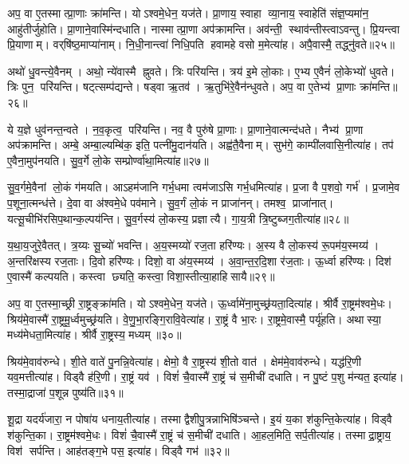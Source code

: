 अप॒ वा ए॒तस्मात्प्रा॒णाः क्रा॑मन्ति।
योऽश्वमे॒धेन॒ यज॑ते।
प्रा॒णाय॒ स्वाहा व्या॒नाय॒ स्वाहेति॑ संज्ञ॒प्यमा॑न॒ आहु॑तीर्जुहोति।
प्रा॒णाने॒वास्मि॑न्दधाति।
नास्मात्प्रा॒णा अप॑क्रामन्ति।
अव॑न्ती॒ स्थाव॑न्तीस्त्वाऽवन्तु।
प्रि॒यन्त्वा प्रि॒याणाम्।
वर्‌षि॑ष्ठ॒माप्या॑नाम्।
नि॒धी॒नान्त्वा॑ निधि॒पति हवामहे वसो म॒मेत्या॑ह।
अपै॒वास्मै॒ तद्ध्नु॑वते॥२५॥

अथो॑ धु॒वन्त्ये॒वैनम्।
अथो॒ न्ये॑वास्मै ह्नुवते।
त्रिः परि॑यन्ति।
त्रय॑ इ॒मे लो॒काः।
ए॒भ्य ए॒वैनं॑ लो॒केभ्यो॑ धुवते।
त्रिः पुन॒ परि॑यन्ति।
षट्त्सम्प॑द्यन्ते।
षड्वा ऋ॒तव॑।
ऋ॒तुभि॑रे॒वैन॑न्धुवते।
अप॒ वा ए॒तेभ्य॑ प्रा॒णाः क्रा॑मन्ति॥२६॥

ये य॒ज्ञे धुव॑नन्त॒न्वते।
न॒व॒कृत्व॒ परि॑यन्ति।
नव॒ वै पुरु॑षे प्रा॒णाः।
प्रा॒णाने॒वात्मन्द॑धते।
नैभ्य॑ प्रा॒णा अप॑क्रामन्ति।
अम्बे॒ अम्बा॒ल्यम्बि॑क॒ इति॒ पत्नी॑मु॒दान॑यति।
अह्व॑तै॒वैनाम्।
सुभ॑गे॒ काम्पी॑लवासि॒नीत्या॑ह।
तप॑ ए॒वैना॒मुप॑नयति।
सु॒व॒र्गे लो॒के सम्प्रोर्ण्वा॑था॒मित्या॑ह॥२७॥

सु॒व॒र्गमे॒वैनां लो॒कं ग॑मयति।
आऽहम॑जानि गर्भ॒धमा त्वम॑जाऽसि गर्भ॒धमित्या॑ह।
प्र॒जा वै प॒शवो॒ गर्भ॑।
प्र॒जामे॒व प॒शूना॒त्मन्ध॑त्ते।
दे॒वा वा अ॑श्वमे॒धे पव॑माने।
सु॒व॒र्गं लो॒कं न प्राजा॑नन्।
तमश्व॒ प्राजा॑नात्।
यत्सू॒चीभि॑रसिप॒थान्क॒ल्पय॑न्ति।
सु॒व॒र्गस्य॑ लो॒कस्य॒ प्रज्ञात्यै।
गा॒य॒त्री त्रि॒ष्टुब्जग॒तीत्या॑ह॥२८॥

य॒था॒य॒जुरे॒वैतत्।
त्र॒य्यः सू॒च्यो॑ भवन्ति।
अ॒य॒स्मय्यो॑ रज॒ता हरि॑ण्यः।
अ॒स्य वै लो॒कस्य॑ रू॒पम॑य॒स्मय्य॑।
अ॒न्तरि॑क्षस्य रज॒ताः।
दि॒वो हरि॑ण्यः।
दिशो॒ वा अ॑य॒स्मय्य॑।
अ॒वा॒न्त॒र॒दि॒शा र॑ज॒ताः।
ऊ॒र्ध्वा हरि॑ण्यः।
दिश॑ ए॒वास्मै॑ कल्पयति।
कस्त्वा छ्यति॒ कस्त्वा॒ विशा॒स्तीत्या॒हाहिसायै॥२९॥\anuvakamend[ह्नु॒व॒ते॒ क्रा॒म॒न्त्यू॒र्ण्वा॒था॒मित्या॑ह॒ जग॒तीत्या॑ह कल्पय॒त्येकं च]

अप॒ वा ए॒तस्मा॒च्छ्री रा॒ष्ट्रङ्क्रा॑मति।
योऽश्वमे॒धेन॒ यज॑ते।
ऊ॒र्ध्वामे॑ना॒मुच्छ्र॑यता॒दित्या॑ह।
श्रीर्वै रा॒ष्ट्रम॑श्वमे॒धः।
श्रिय॑मे॒वास्मै॑ रा॒ष्ट्रमू॒र्ध्वमुच्छ्र॑यति।
वे॒णु॒भा॒रङ्गि॒रावि॒वेत्या॑ह।
रा॒ष्ट्रं वै भा॒रः।
रा॒ष्ट्रमे॒वास्मै॒ पर्यू॑हति।
अथास्या॒ मध्य॑मेधता॒मित्या॑ह।
श्रीर्वै रा॒ष्ट्रस्य॒ मध्यम्॥३०॥

श्रिय॑मे॒वाव॑रुन्धे।
शी॒ते वाते॑ पु॒नन्नि॒वेत्या॑ह।
क्षेमो॒ वै रा॒ष्ट्रस्य॑ शी॒तो वात॑।
क्षेम॑मे॒वाव॑रुन्धे।
यद्ध॑रि॒णी यव॒मत्तीत्या॑ह।
विड्वै ह॑रि॒णी।
रा॒ष्ट्रं यव॑।
विशं॑ चै॒वास्मै॑ रा॒ष्ट्रं च॑ स॒मीची॑ दधाति।
न पु॒ष्टं प॒शु म॑न्यत॒ इत्या॑ह।
तस्मा॒द्राजा॑ प॒शून्न पुष्य॑ति॥३१॥

शू॒द्रा यदर्य॑जारा॒ न पोषा॑य धनाय॒तीत्या॑ह।
तस्माद्वैशीपु॒त्रन्नाभिषि॑ञ्चन्ते।
इ॒यं य॒का श॑कुन्ति॒केत्या॑ह।
विड्वै श॑कुन्ति॒का।
रा॒ष्ट्रम॑श्वमे॒धः।
विशं॑ चै॒वास्मै॑ रा॒ष्ट्रं च॑ स॒मीची॑ दधाति।
आ॒हल॒मिति॒ सर्प॒तीत्या॑ह।
तस्माद्रा॒ष्ट्राय॒ विश॑ सर्पन्ति।
आह॑तङ्ग॒भे पस॒ इत्या॑ह।
विड्वै गभ॑॥३२॥

